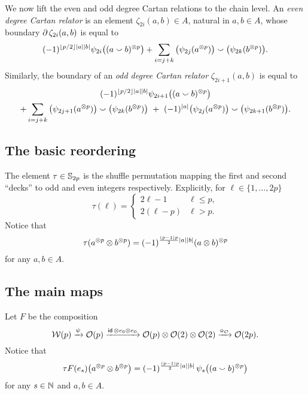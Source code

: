 We now lift the even and odd degree Cartan relations to the chain level.
An \textit{even degree Cartan relator} is an element $\zeta_{2i}(a,b) \in A$, natural in $a,b \in A$, whose boundary $\operatorname{\partial}\zeta_{2i}(a,b)$ is equal to
\begin{align*}
	(-1)^{\lfloor p/2\rfloor\lvert a\rvert\lvert b\rvert} \psi_{2i}\big((a \smallsmile b)^{\otimes p}\big) +
	\sum_{i=j+k}\big(\psi_{2j}(a^{\otimes p})\big) \smallsmile \big(\psi_{2k}(b^{\otimes p})\big).
\end{align*}
Similarly, the boundary of an \textit{odd degree Cartan relator} $\zeta_{2i+1}(a,b)$ is equal to
\begin{multline*}
	(-1)^{\lfloor p/2\rfloor\lvert a\rvert\lvert b\rvert} \psi_{2i+1}\big((a \smallsmile b)^{\otimes p}\big)\\ +
	\sum_{i=j+k} \big(\psi_{2j+1}(a^{\otimes p})\big) \smallsmile \big(\psi_{2k}(b^{\otimes p})\big)\ +\
	(-1)^{\lvert a\rvert}\big(\psi_{2j}(a^{\otimes p})\big) \smallsmile \big(\psi_{2k+1}(b^{\otimes p})\big).
\end{multline*}

\subsection{The basic reordering}\label{ss:reordering}

The element $\tau \in \mathbb{S}_{2p}$ is the shuffle permutation mapping the first and second ``decks'' to odd and even integers respectively.
Explicitly, for $\ell \in \{1,\dots,2p\}$
\begin{equation*}
	\tau(\ell) =
	\begin{cases}
		2\ell-1 & \ell \leq p, \\
		2(\ell-p) & \ell > p.
	\end{cases}
\end{equation*}
Notice that
\[
\tau(a^{\otimes p} \otimes b^{\otimes p}) = (-1)^{\frac{(p-1)p}{2}\lvert a\rvert\lvert b\rvert} (a \otimes b)^{\otimes p}
\]
for any $a,b \in A$.

\subsection{The main maps}\label{ss:main maps}

\sssec

Let $F$ be the composition
\[
\mathcal{W}(p) \xrightarrow{\psi} \mathcal{O}(p) \xrightarrow{\mathsf{id}\, \otimes e_0 \otimes e_0} \mathcal{O}(p) \otimes \mathcal{O}(2) \otimes \mathcal{O}(2) \xrightarrow{\bm{\circ}_{\mathcal{O}}} \mathcal{O}(2p).
\]
Notice that
\[
\tau F(e_s)\big(a^{\otimes p} \otimes b^{\otimes p}\big) =
(-1)^{\frac{(p-1)p}{2}\lvert a\rvert\lvert b\rvert} \, \psi_{s}\big((a \smallsmile b)^{\otimes p}\big)
\]
for any $s \in \mathbb{N}$ and $a,b \in A$.

